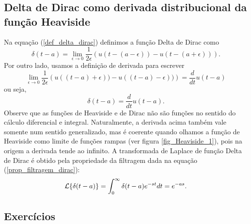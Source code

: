 \subsection{Delta de Dirac como derivada distribucional da função Heaviside}
Na equação (\ref{def_delta_dirac}) definimos a função Delta de Dirac como
\begin{equation}
\delta(t-a)=\lim_{\epsilon\to 0}\frac{1}{2\epsilon}\left(u(t-(a-\epsilon))-u(t-(a+\epsilon))\right).
\end{equation}
Por outro lado, usamos a definição de derivada para escrever
\begin{equation}
\lim_{\epsilon\to 0}\frac{1}{2\epsilon}\left(u((t-a)+\epsilon))-u((t-a)-\epsilon))\right)=\frac{d}{dt}u(t-a)
\end{equation}
ou seja,
\begin{equation}
\delta(t-a)=\frac{d}{dt}u(t-a).
\end{equation}
Observe que as funções de Heaviside e de Dirac não são funções no sentido do cálculo diferencial e integral. Naturalmente, a derivada acima também vale somente num sentido generalizado, mas é coerente quando olhamos a função de Heaviside como limite de funções rampas (ver figura \ref{fig_Heaviside_1}), pois na origem a derivada tende ao infinito.
A transformada de Laplace de função Delta de Dirac é obtido pela propriedade da filtragem dada na equação (\ref{prop_filtragem_dirac}):
\begin{equation}{\label{prop_trans_delta_dirac}}
\mathcal{L}\{\delta(t-a)\}=\int_0^\infty \delta(t-a)e^{-st}dt=e^{-as}.
\end{equation}

\subsection*{Exercícios}%


